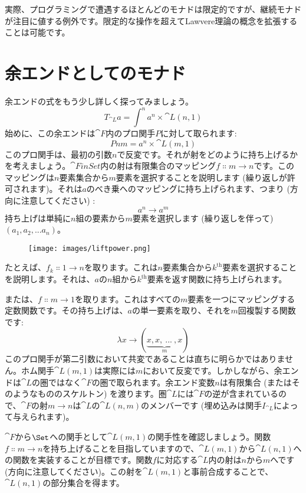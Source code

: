 実際、プログラミングで遭遇するほとんどのモナドは限定的ですが、継続モナドが注目に値する例外です。限定的な操作を超えてLawvere理論の概念を拡張することは可能です。

\section{余エンドとしてのモナド}

余エンドの式をもう少し詳しく探ってみましょう。
\[T_{\cat{L}} a = \int^n a^n \times \cat{L}(n, 1)\]
始めに、この余エンドは$\cat{F}$内のプロ関手$P$に対して取られます: 
\[P n m = a^n \times \cat{L}(m, 1)\]
このプロ関手は、最初の引数$n$で反変です。それが射をどのように持ち上げるかを考えましょう。$\cat{FinSet}$内の射は有限集合のマッピング$f \Colon m \to n$です。このマッピングは$n$要素集合から$m$要素を選択することを説明します (繰り返しが許可されます)。それは$a$のべき乗へのマッピングに持ち上げられます、つまり (方向に注意してください) : 
\[a^n \to a^m\]
持ち上げは単純に$n$組の要素から$m$要素を選択します (繰り返しを伴って) $(a_1, a_2,...a_n)$。

\begin{figure}[H]
  \centering
  \texttt{[image: images/liftpower.png]}
\end{figure}

たとえば、$f_k \Colon 1 \to n$を取ります。これは$n$要素集合から$k^\text{th}$要素を選択することを説明します。それは、$a$の$n$組から$k^\text{th}$要素を返す関数に持ち上げられます。

または、$f \Colon m \to 1$を取ります。これはすべての$m$要素を一つにマッピングする定数関数です。その持ち上げは、$a$の単一要素を取り、それを$m$回複製する関数です: 
\[\lambda{}x \to (\underbrace{x, x,\ ...\ , x}_{m})\]
このプロ関手が第二引数において共変であることは直ちに明らかではありません。ホム関手$\cat{L}(m, 1)$は実際には$m$において反変です。しかしながら、余エンドは$\cat{L}$の圏ではなく$\cat{F}$の圏で取られます。余エンド変数$n$は有限集合 (またはそのようなもののスケルトン) を渡ります。圏$\cat{L}$には$\cat{F}$の逆が含まれているので、$\cat{F}$の射$m \to n$は$\cat{L}$の$\cat{L}(n, m)$のメンバーです (埋め込みは関手$I_{\cat{L}}$によって与えられます)。

$\cat{F}$から$\Set$への関手として$\cat{L}(m, 1)$の関手性を確認しましょう。関数$f \Colon m \to n$を持ち上げることを目指していますので、$\cat{L}(m, 1)$から$\cat{L}(n, 1)$への関数を実装することが目標です。関数$f$に対応する$\cat{L}$内の射は$n$から$m$へです (方向に注意してください)。この射を$\cat{L}(m, 1)$と事前合成することで、$\cat{L}(n, 1)$の部分集合を得ます。

